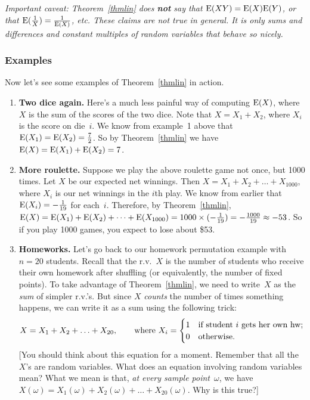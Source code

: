 \documentclass[11pt]{article}
\def\Ex#1{{\rm E}(#1)}
\newcounter{thm}
\begin{document}
{\it Important caveat: Theorem~\ref{thmlin} does\/ {\bf not} say that
$\Ex{XY}=\Ex{X}\Ex{Y}$, or that $\Ex{{1\over X}}={1\over{\Ex{X}}}$,
etc.  These claims are not true in general.  It is only\/ {\rm sums}
and\/ {\rm differences} and\/ {\rm constant multiples} of random variables
that behave so nicely.}

\subsubsection*{Examples}
Now let's see some examples of Theorem~\ref{thmlin} in action.
\begin{enumerate}
\item {\bf Two dice again.}  Here's a much less painful way of computing
$\Ex{X}$, where $X$ is the sum of the scores of the two dice.  Note
that $X=X_1+X_2$, where $X_i$ is the score on die~$i$.  We know from
example~1 above that $\Ex{X_1}=\Ex{X_2}={7\over 2}$.  So by
Theorem~\ref{thmlin} we have $\Ex{X}=\Ex{X_1}+\Ex{X_2}=7$.
\item {\bf More roulette.}  Suppose we play the above roulette game
not once, but 1000 times.  Let $X$ be our expected net winnings.
Then $X=X_1+X_2+\ldots+X_{1000}$, where $X_i$ is our net winnings
in the $i$th play.  We know from earlier that $\Ex{X_i}=-{1\over{19}}$
for each~$i$.  Therefore, by Theorem~\ref{thmlin},
$\Ex{X}=\Ex{X_1}+\Ex{X_2}+\cdots+\Ex{X_{1000}}=1000\times(-{{1}\over{19}})
=-{{1000}\over{19}}\approx -53$.  So if you play 1000 games, you expect
to lose about \$53.

\item {\bf Homeworks.}  Let's go back to our homework permutation example with $n = 20$ students.
Recall that the r.v.~$X$ is the number of students who receive their
own homework after shuffling (or equivalently, the number of fixed
points).  To take advantage of Theorem~\ref{thmlin}, we need to write~$X$
as the {\it sum\/} of simpler r.v.'s.  But since $X$ {\it counts\/}
the number of times something happens, we can write it as a sum
using the following trick:
\begin{equation}\label{eqhw}
   X=X_1+X_2+\ldots+X_{20},\qquad\hbox{\rm where
                  $X_i=\begin{cases} 1 & \hbox{\rm if student $i$ gets her own hw}; \\
                       0 & \hbox{\rm otherwise}. \end{cases}$}
\end{equation}
[You should think about this equation for a moment.  Remember that
all the $X$'s are random variables.  What does an equation involving
random variables mean?  What we mean is that,
{\it at every sample point}~$\omega$, we have
$X(\omega)=X_1(\omega)+X_2(\omega)+\ldots+X_{20}(\omega)$.  Why
is this true?]


\end{enumerate}
\end{document}
